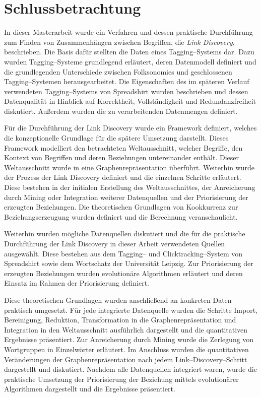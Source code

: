 \chapter{Schlussbetrachtung}
\label{summary}

In dieser Masterarbeit wurde ein Verfahren und dessen praktische Durchführung zum Finden von Zusammenhängen zwischen Begriffen, die \emph{Link Discovery}, beschrieben. Die Basis dafür stellten die Daten eines Tagging--Systems dar. Dazu wurden Tagging--Systeme grundlegend erläutert, deren Datenmodell definiert und die grundlegenden Unterschiede zwischen Folksonomies und geschlossenen Tagging--Systemen herausgearbeitet. Die Eigenschaften des im späteren Verlauf verwendeten Tagging--Systems von Spreadshirt wurden beschrieben und dessen Datenqualität in Hinblick auf Korrektheit, Vollständigkeit und Redundanzfreiheit diskutiert. Außerdem wurden die zu verarbeitenden Datenmengen definiert.

Für die Durchführung der Link Discovery wurde ein Framework definiert, welches die konzeptionelle Grundlage für die spätere Umsetzung darstellt. Dieses Framework modelliert den betrachteten Weltausschnitt, welcher Begriffe, den Kontext von Begriffen und deren Beziehungen untereinander enthält. Dieser Weltausschnitt wurde in eine Graphenrepräsentation überführt. Weiterhin wurde der Prozess der Link Discovery definiert und die einzelnen Schritte erläutert. Diese bestehen in der initialen Erstellung des Weltausschnittes, der Anreicherung durch Mining oder Integration weiterer Datenquellen und der Priorisierung der erzeugten Beziehungen. Die theoretischen Grundlagen von Kookkurrenz zur Beziehungserzeugung wurden definiert und die Berechnung veranschaulicht.

Weiterhin wurden mögliche Datenquellen diskutiert und die für die praktische Durchführung der Link Discovery in dieser Arbeit verwendeten Quellen ausgewählt. Diese bestehen aus dem Tagging-- und Clicktracking--System von Spreadshirt sowie dem Wortschatz der Universität Leipzig. Zur Priorisierung der erzeugten Beziehungen wurden evolutionäre Algorithmen erläutert und deren Einsatz im Rahmen der Priorisierung definiert.

Diese theoretischen Grundlagen wurden anschließend an konkreten Daten praktisch umgesetzt. Für jede integrierte Datenquelle wurden die Schritte Import, Bereinigung, Reduktion, Transformation in die Graphenrepräsentation und Integration in den Weltausschnitt ausführlich dargestellt und die quantitativen Ergebnisse präsentiert. Zur Anreicherung durch Mining wurde die Zerlegung von Wortgruppen in Einzelwörter erläutert. Im Anschluss wurden die quantitativen Veränderungen der Graphenrepräsentation nach jedem Link--Discovery--Schritt dargestellt und diskutiert. Nachdem alle Datenquellen integriert waren, wurde die praktische Umsetzung der Priorisierung der Beziehung mittels evolutionärer Algorithmen dargestellt und die Ergebnisse präsentiert.

